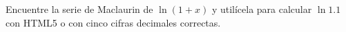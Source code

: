 \item Encuentre la serie de Maclaurin de $\ln(1+x)$ y utilícela para calcular $\ln 1.1$ con HTML5 o con cinco cifras decimales correctas.
